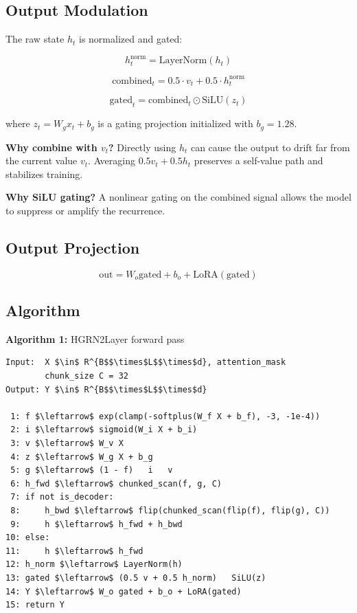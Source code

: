 \subsection{Output Modulation}

The raw state $h_t$ is normalized and gated:

\[
h_t^\text{norm} = \text{LayerNorm}(h_t)
\tag{4.15}
\]

\[
\text{combined}_t = 0.5 \cdot v_t + 0.5 \cdot h_t^\text{norm}
\tag{4.16}
\]

\[
\text{gated}_t = \text{combined}_t \odot \text{SiLU}(z_t)
\tag{4.17}
\]

where $z_t = W_g x_t + b_g$ is a gating projection initialized with $b_g = 1.28$.

\textbf{Why combine with $v_t$?} Directly using $h_t$ can cause the output to 
drift far from the current value $v_t$. Averaging $0.5 v_t + 0.5 h_t$ 
preserves a self-value path and stabilizes training.

\textbf{Why SiLU gating?} A nonlinear gating on the combined signal allows the 
model to suppress or amplify the recurrence.

\subsection{Output Projection}

\[
\text{out} = W_o \text{gated} + b_o + \text{LoRA}(\text{gated})
\tag{4.18}
\]

\subsection{Algorithm}

\textbf{Algorithm 1:} HGRN2Layer forward pass
\begin{lstlisting}
Input:  X $\in$ R^{B$$\times$L$$\times$d}, attention_mask
        chunk_size C = 32
Output: Y $\in$ R^{B$$\times$L$$\times$d}

 1: f $\leftarrow$ exp(clamp(-softplus(W_f X + b_f), -3, -1e-4))
 2: i $\leftarrow$ sigmoid(W_i X + b_i)
 3: v $\leftarrow$ W_v X
 4: z $\leftarrow$ W_g X + b_g
 5: g $\leftarrow$ (1 - f)   i   v
 6: h_fwd $\leftarrow$ chunked_scan(f, g, C)
 7: if not is_decoder:
 8:     h_bwd $\leftarrow$ flip(chunked_scan(flip(f), flip(g), C))
 9:     h $\leftarrow$ h_fwd + h_bwd
10: else:
11:     h $\leftarrow$ h_fwd
12: h_norm $\leftarrow$ LayerNorm(h)
13: gated $\leftarrow$ (0.5 v + 0.5 h_norm)   SiLU(z)
14: Y $\leftarrow$ W_o gated + b_o + LoRA(gated)
15: return Y
\end{lstlisting}

